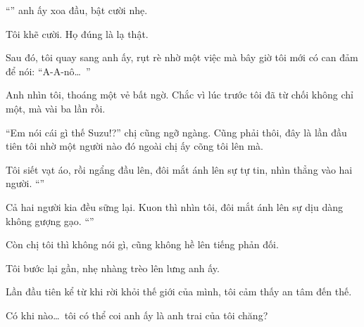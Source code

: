 \documentclass[../main.tex]{subfiles}
\begin{document}
``'' anh ấy xoa đầu, bật cười nhẹ.

Tôi khẽ cười. Họ đúng là lạ thật.

Sau đó, tôi quay sang anh ấy, rụt rè nhờ một việc mà bây giờ tôi mới có can đảm để nói: ``A-A-nô\dots\ ''

Anh nhìn tôi, thoáng một vẻ bất ngờ. Chắc vì lúc trước tôi đã từ chối không chỉ một, mà vài ba lần rồi.

``Em nói cái gì thế Suzu!?'' chị cũng ngỡ ngàng. Cũng phải thôi, đây là lần đầu tiên tôi nhờ một người nào đó ngoài chị ấy cõng tôi lên mà.

Tôi siết vạt áo, rồi ngẩng đầu lên, đôi mắt ánh lên sự tự tin, nhìn thẳng vào hai người. ``''

Cả hai người kia đều sững lại. Kuon thì nhìn tôi, đôi mắt ánh lên sự dịu dàng không gượng gạo. ``''

Còn chị tôi thì không nói gì, cũng không hề lên tiếng phản đối.

Tôi bước lại gần, nhẹ nhàng trèo lên lưng anh ấy.

Lần đầu tiên kể từ khi rời khỏi thế giới của mình, tôi cảm thấy an tâm đến thế.

Có khi nào\dots\ tôi có thể coi anh ấy là anh trai của tôi chăng?
\end{document}
